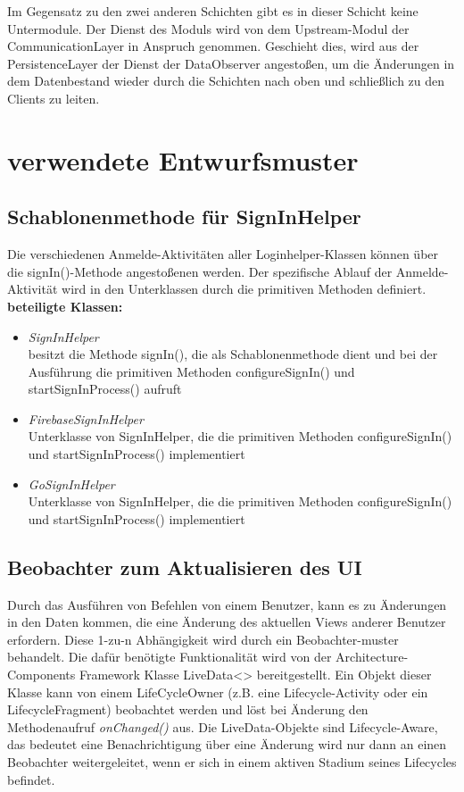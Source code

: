 \documentclass[11pt,a4paper]{article}
\begin{document}
Im Gegensatz zu den zwei anderen Schichten gibt es in dieser Schicht keine Untermodule. Der Dienst des Moduls wird von dem Upstream-Modul der CommunicationLayer in Anspruch genommen. Geschieht dies, wird aus der PersistenceLayer der Dienst der DataObserver angestoßen, um die Änderungen in dem Datenbestand wieder durch die Schichten nach oben und schließlich zu den Clients zu leiten.\\

\newpage


\section{verwendete Entwurfsmuster}

\subsection{Schablonenmethode für SignInHelper}
Die verschiedenen Anmelde-Aktivitäten aller Loginhelper-Klassen können über die signIn()-Methode angestoßenen werden. Der spezifische Ablauf der Anmelde-Aktivität wird in den Unterklassen durch die primitiven Methoden definiert. \\

\textbf{beteiligte Klassen:}
\begin{itemize}
	\item \textit{SignInHelper}\\ besitzt die Methode signIn(), die als Schablonenmethode dient und bei der Ausführung die primitiven Methoden configureSignIn() und startSignInProcess() aufruft
	\item \textit{FirebaseSignInHelper}\\ Unterklasse von SignInHelper, die die primitiven Methoden configureSignIn() und startSignInProcess() implementiert
	\item \textit{GoSignInHelper}\\ Unterklasse von SignInHelper, die die primitiven Methoden configureSignIn() und startSignInProcess() implementiert
\end{itemize}

\subsection{Beobachter zum Aktualisieren des UI}
Durch das Ausführen von Befehlen von einem Benutzer, kann es zu Änderungen in den Daten kommen, die eine Änderung des aktuellen Views anderer Benutzer erfordern. Diese 1-zu-n Abhängigkeit wird durch ein Beobachter-muster behandelt. Die dafür benötigte Funktionalität wird von der Architecture-Components Framework Klasse LiveData<> bereitgestellt. Ein Objekt dieser Klasse kann von einem LifeCycleOwner (z.B. eine Lifecycle-Activity oder ein LifecycleFragment) beobachtet werden und löst bei Änderung den Methodenaufruf \textit{onChanged()} aus. Die LiveData-Objekte sind Lifecycle-Aware, das bedeutet eine Benachrichtigung über eine Änderung wird nur dann an einen Beobachter weitergeleitet, wenn er sich in einem aktiven Stadium seines Lifecycles befindet.\\
\end{document}
